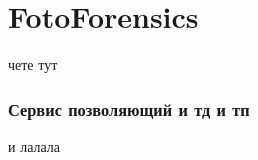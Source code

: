 \documentclass[12pt]{article}
\begin{document}
\chapter{FotoForensics}
чете тут
\subsection{Сервис позволяющий и тд и тп}
и лалала
\end{document}
